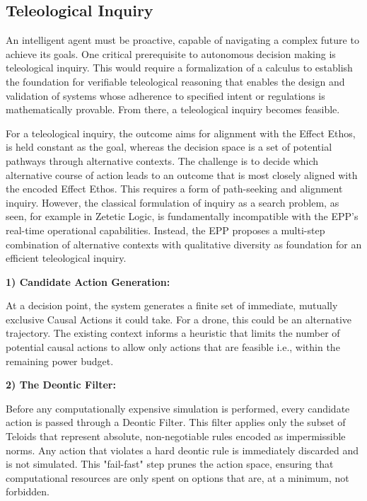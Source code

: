 \subsection{Teleological Inquiry}

An intelligent agent must be proactive, capable of navigating a complex future to achieve its goals. One critical prerequisite to autonomous decision making is teleological inquiry. This would require a  formalization of a calculus to establish the foundation for verifiable teleological reasoning that enables the design and validation of systems whose adherence to specified intent or regulations is mathematically provable. From there, a teleological inquiry becomes feasible. 

For a teleological inquiry, the outcome aims for alignment with the Effect Ethos, is held constant as the goal, whereas the decision space is a set of potential pathways through alternative contexts. The challenge is to decide which alternative course of action leads to an outcome that is most closely aligned with the encoded Effect Ethos. This requires a form of path-seeking and alignment inquiry. However, the classical formulation of inquiry as a search problem, as seen, for example in Zetetic Logic\cite{Millson2020Zetetic}, is fundamentally incompatible with the EPP's real-time operational capabilities. Instead, the EPP proposes a multi-step combination of alternative contexts with qualitative diversity as foundation for an efficient teleological inquiry.\newline 

\textbf{1) Candidate Action Generation:}

At a decision point, the system generates a finite set of immediate, mutually exclusive Causal Actions it could take. For a drone, this could be an alternative trajectory. The existing context informs a heuristic that limits the number of potential causal actions to allow only actions that are feasible i.e., within the remaining power budget.\newline

\textbf{2) The Deontic Filter:}

Before any computationally expensive simulation is performed, every candidate action is passed through a Deontic Filter. This filter applies only the subset of Teloids that represent absolute, non-negotiable rules encoded as impermissible norms. Any action that violates a hard deontic rule is immediately discarded and is not simulated. This "fail-fast" step prunes the action space, ensuring that computational resources are only spent on options that are, at a minimum, not forbidden.


